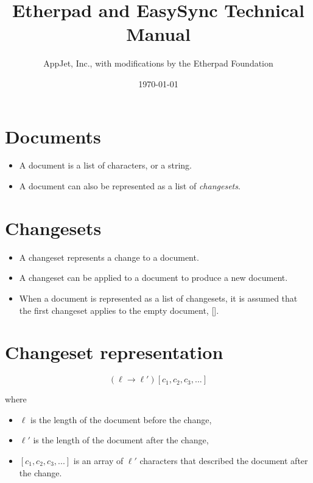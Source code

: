 \documentclass{article}
\begin{document}
\title{Etherpad and EasySync Technical Manual}
\author{AppJet, Inc., with modifications by the Etherpad Foundation}
\date{\today}

\maketitle

\tableofcontents

\section{Documents}
\begin{itemize}
\item A document is a list of characters, or a string.
\item A document can also be represented as a list of \emph{changesets}.
\end{itemize}

\section{Changesets}

\begin{itemize}
\item A changeset represents a change to a document.
\item A changeset can be applied to a document to produce a new document.
\item When a document is represented as a list of changesets, it is assumed that the first changeset applies to the empty document, [].
\end{itemize}


\section{Changeset representation} \label{representation}

$$(\ell \rightarrow \ell')[c_1,c_2,c_3,...]$$

where

\begin{itemize}
\item[] $\ell$ is the length of the document before the change,
\item[] $\ell'$ is the length of the document after the change,
\item[] $[c_1,c_2,c_3,...]$ is an array of $\ell'$ characters that described the document after the change.
\end{itemize}
\end{document}
